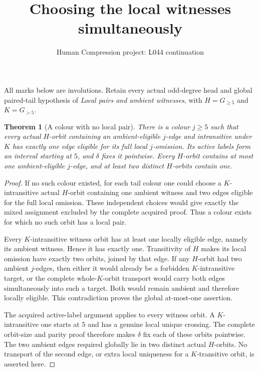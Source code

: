 \documentclass[11pt,a4paper]{article}
\title{Choosing the local witnesses simultaneously}
\author{Human Compression project: L044 continuation}
\date{}
\newtheorem{theorem}[lemma]{Theorem}
\begin{document}
\maketitle
All marks below are involutions. Retain every actual
odd-degree head and global paired-tail hypothesis of
\emph{Local pairs and ambient witnesses}, with
$H=G_{\ge5}$ and $K=G_{>5}$.

\begin{theorem}[A colour with no local pair]
There is a colour $j\ge5$ such that every actual
$H$-orbit containing an ambient-eligible $j$-edge
and intransitive under $K$ has exactly one edge
eligible for its full local $j$-omission. Its
active labels form an interval starting at $5$,
and $\delta$ fixes it pointwise. Every $H$-orbit
contains at most one ambient-eligible $j$-edge,
and at least two distinct $H$-orbits contain one.
\end{theorem}
\begin{proof}
If no such colour existed, for each tail colour
one could choose a $K$-intransitive actual $H$-orbit
containing one ambient witness and two edges
eligible for the full local omission. These
independent choices would give exactly the mixed
assignment excluded by the complete acquired proof.
Thus a colour exists for which no such orbit
has a local pair.

Every $K$-intransitive witness orbit has at least
one locally eligible edge, namely its ambient
witness. Hence it has exactly one. Transitivity
of $H$ makes its local omission have exactly two
orbits, joined by that edge. If any $H$-orbit had
two ambient $j$-edges, then either it would already
be a forbidden $K$-intransitive target, or the
complete whole-$K$-orbit transport would carry
both edges simultaneously into such a target.
Both would remain ambient and therefore locally
eligible. This contradiction proves the global
at-most-one assertion.

The acquired active-label argument applies to
every witness orbit. A $K$-intransitive one starts
at $5$ and has a genuine local unique crossing.
The complete orbit-size and parity proof therefore
makes $\delta$ fix each of these orbits pointwise.
The two ambient edges required globally lie in
two distinct actual $H$-orbits. No transport of
the second edge, or extra local uniqueness for a
$K$-transitive orbit, is asserted here.
\end{proof}
\end{document}

